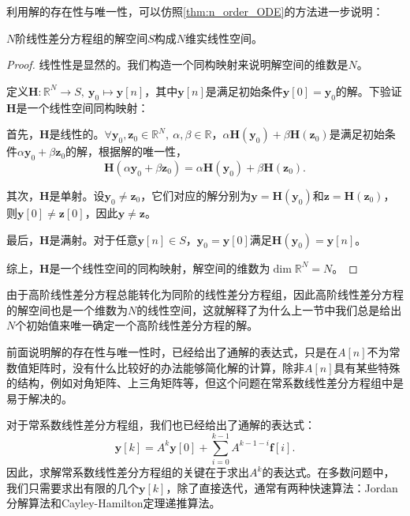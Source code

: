 利用解的存在性与唯一性，可以仿照\cref{thm:n_order_ODE}的方法进一步说明：
\begin{theorem}
    $N$阶线性差分方程组的解空间$S$构成$N$维实线性空间。
\end{theorem}
\begin{proof}
    线性性是显然的。我们构造一个同构映射来说明解空间的维数是$N$。

    定义$\mathbf{H}:\mathbb{R}^N\to S,\ \mathbf{y}_0\mapsto\mathbf{y}[n]$，其中$\mathbf{y}[n]$是满足初始条件$\mathbf{y}[0]=\mathbf{y}_0$的解。下验证$\mathbf{H}$是一个线性空间同构映射：

    首先，$\mathbf{H}$是线性的。$\forall \mathbf{y}_0,\mathbf{z}_0\in\mathbb{R}^N,\ \alpha,\beta\in\mathbb{R}$，$\alpha\mathbf{H}(\mathbf{y}_0)+\beta\mathbf{H}(\mathbf{z}_0)$是满足初始条件$\alpha\mathbf{y}_0+\beta\mathbf{z}_0$的解，根据解的唯一性，
    \begin{equation}
        \mathbf{H}(\alpha\mathbf{y}_0+\beta\mathbf{z}_0)=\alpha\mathbf{H}(\mathbf{y}_0)+\beta\mathbf{H}(\mathbf{z}_0).
    \end{equation}

    其次，$\mathbf{H}$是单射。设$\mathbf{y}_0\neq\mathbf{z}_0$，它们对应的解分别为$\mathbf{y}=\mathbf{H}(\mathbf{y}_0)$和$\mathbf{z}=\mathbf{H}(\mathbf{z}_0)$，则$\mathbf{y}[0]\neq\mathbf{z}[0]$，因此$\mathbf{y}\neq\mathbf{z}$。

    最后，$\mathbf{H}$是满射。对于任意$\mathbf{y}[n]\in S$，$\mathbf{y}_0=\mathbf{y}[0]$满足$\mathbf{H}(\mathbf{y}_0)=\mathbf{y}[n]$。

    综上，$\mathbf{H}$是一个线性空间的同构映射，解空间的维数为$\dim\mathbb{R}^N=N$。
\end{proof}

由于高阶线性差分方程总能转化为同阶的线性差分方程组，因此高阶线性差分方程的解空间也是一个维数为$N$的线性空间，这就解释了为什么上一节中我们总是给出$N$个初始值来唯一确定一个高阶线性差分方程的解。

前面说明解的存在性与唯一性时，已经给出了通解的表达式，只是在$A[n]$不为常数值矩阵时，没有什么比较好的办法能够简化解的计算，除非$A[n]$具有某些特殊的结构，例如对角矩阵、上三角矩阵等，但这个问题在常系数线性差分方程组中是易于解决的。

对于常系数线性差分方程组，我们也已经给出了通解的表达式：
\begin{equation}
    \mathbf{y}[k]=A^k\mathbf{y}[0]+\sum_{i=0}^{k-1}A^{k-1-i}\mathbf{f}[i].
\end{equation}
因此，求解常系数线性差分方程组的关键在于求出$A^k$的表达式。在多数问题中，我们只需要求出有限的几个$\mathbf{y}[k]$，除了直接迭代，通常有两种快速算法：Jordan分解算法和Cayley-Hamilton定理递推算法。

